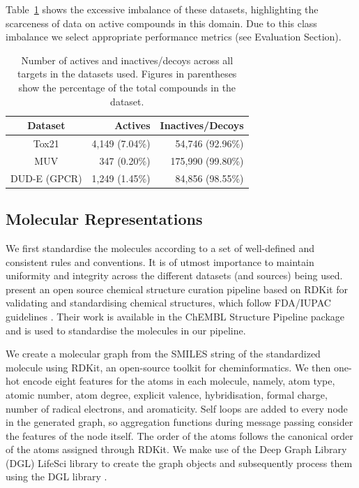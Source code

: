 Table~\ref{table:datasetimbalance} shows the excessive imbalance of these datasets, highlighting the scarceness of data on active compounds in this domain. Due to this class imbalance we select appropriate performance metrics (see Evaluation Section).

\begin{table}[h]
	\centering
	\caption{Number of actives and inactives/decoys across all targets in the datasets used. Figures in parentheses show the percentage of the total compounds in the dataset.}
	\begin{tabular}{@{}crr@{}}
		\hline
		Dataset 		& Actives 			& Inactives/Decoys \\
		\hline
		Tox21 			& 4,149 (7.04\%) 	& 54,746 (92.96\%) \\
		MUV 			& 347 (0.20\%) 		& 175,990 (99.80\%) \\
		DUD-E (GPCR) 	& 1,249 (1.45\%) 	& 84,856 (98.55\%) \\
		\hline				
	\end{tabular}
	\label{table:datasetimbalance}
\end{table}

\subsection{Molecular Representations}

We first standardise the molecules according to a set of well-defined and consistent rules and conventions. It is of utmost importance to maintain uniformity and integrity across the different datasets (and sources) being used. \citet{bento2020open} present an open source chemical structure curation pipeline based on RDKit\citep{rdkit} for validating and standardising chemical structures, which follow FDA/IUPAC guidelines \citep{brecher2006graphical, food2007substance}. Their work is available in the ChEMBL Structure Pipeline package \cite{bento2020open} and is used to standardise the molecules in our pipeline. 

We create a molecular graph from the SMILES string of the standardized molecule using RDKit, an open-source toolkit for cheminformatics. We then one-hot encode eight features for the atoms in each molecule, namely, atom type, atomic number, atom degree, explicit valence, hybridisation, formal charge, number of radical electrons, and aromaticity. Self loops are added to every node in the generated graph, so aggregation functions during message passing consider the features of the node itself. The order of the atoms follows the canonical order of the atoms assigned through RDKit. We make use of the Deep Graph Library (DGL) LifeSci \cite{dgllife} library to create the graph objects and subsequently process them using the DGL library \cite{wang2019dgl}.

